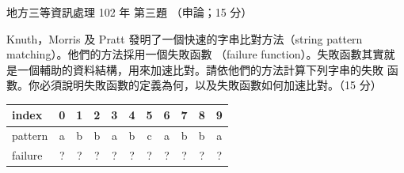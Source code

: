\begin{pastexam}[label={px:df3-102-ds-03}]{地方三等資訊處理 102 年 第三題}
（申論；15 分）

Knuth，Morris 及 Pratt 發明了一個快速的字串比對方法（string pattern matching）。他們的方法採用一個失敗函數
（failure function）。失敗函數其實就是一個輔助的資料結構，用來加速比對。請依他們的方法計算下列字串的失敗
函數。你必須說明失敗函數的定義為何，以及失敗函數如何加速比對。（15 分）
\begin{center}
\begin{tabular}{|l|*{10}{c|}}
\hline
index & 0 & 1 & 2 & 3 & 4 & 5 & 6 & 7 & 8 & 9 \\ \hline
pattern & a & b & b & a & b & c & a & b & b & a \\ \hline
failure & ? & ? & ? & ? & ? & ? & ? & ? & ? & ? \\ \hline
\end{tabular}
\end{center}
\end{pastexam}

